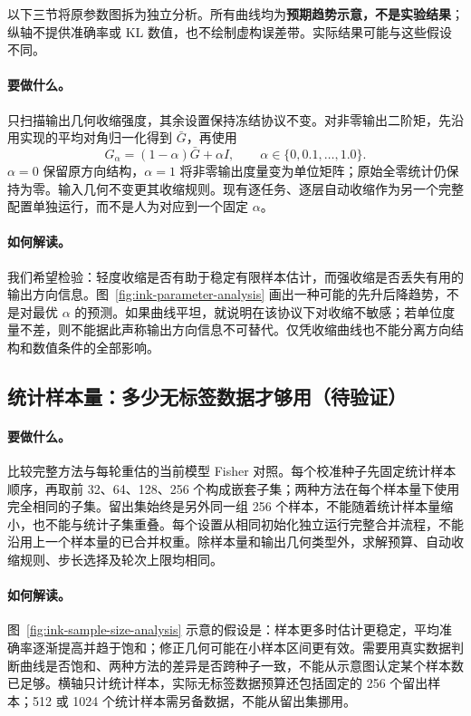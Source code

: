 以下三节将原参数图拆为独立分析。所有曲线均为\textbf{预期趋势示意，不是实验结果}；纵轴不提供准确率或 KL 数值，也不绘制虚构误差带。实际结果可能与这些假设不同。

\paragraph{要做什么。}
只扫描输出几何收缩强度，其余设置保持冻结协议不变。对非零输出二阶矩，先沿用实现的平均对角归一化得到 $\bar G$，再使用
\[
  G_\alpha=(1-\alpha)\bar G+\alpha I,\qquad
  \alpha\in\{0,0.1,\ldots,1.0\}.
\]
$\alpha=0$ 保留原方向结构，$\alpha=1$ 将非零输出度量变为单位矩阵；原始全零统计仍保持为零。输入几何不变更其收缩规则。现有逐任务、逐层自动收缩作为另一个完整配置单独运行，而不是人为对应到一个固定 $\alpha$。



\paragraph{如何解读。}
我们希望检验：轻度收缩是否有助于稳定有限样本估计，而强收缩是否丢失有用的输出方向信息。图~\ref{fig:ink-parameter-analysis} 画出一种可能的先升后降趋势，不是对最优 $\alpha$ 的预测。如果曲线平坦，就说明在该协议下对收缩不敏感；若单位度量不差，则不能据此声称输出方向信息不可替代。仅凭收缩曲线也不能分离方向结构和数值条件的全部影响。

\FloatBarrier
\subsection{统计样本量：多少无标签数据才够用（待验证）}
\label{sec:ink-sample-size-analysis}

\paragraph{要做什么。}
比较完整方法与每轮重估的当前模型 Fisher 对照。每个校准种子先固定统计样本顺序，再取前 32、64、128、256 个构成嵌套子集；两种方法在每个样本量下使用完全相同的子集。留出集始终是另外同一组 256 个样本，不能随着统计样本量缩小，也不能与统计子集重叠。每个设置从相同初始化独立运行完整合并流程，不能沿用上一个样本量的已合并权重。除样本量和输出几何类型外，求解预算、自动收缩规则、步长选择及轮次上限均相同。



\paragraph{如何解读。}
图~\ref{fig:ink-sample-size-analysis} 示意的假设是：样本更多时估计更稳定，平均准确率逐渐提高并趋于饱和；修正几何可能在小样本区间更有效。需要用真实数据判断曲线是否饱和、两种方法的差异是否跨种子一致，不能从示意图认定某个样本数已足够。横轴只计统计样本，实际无标签数据预算还包括固定的 256 个留出样本；512 或 1024 个统计样本需另备数据，不能从留出集挪用。

